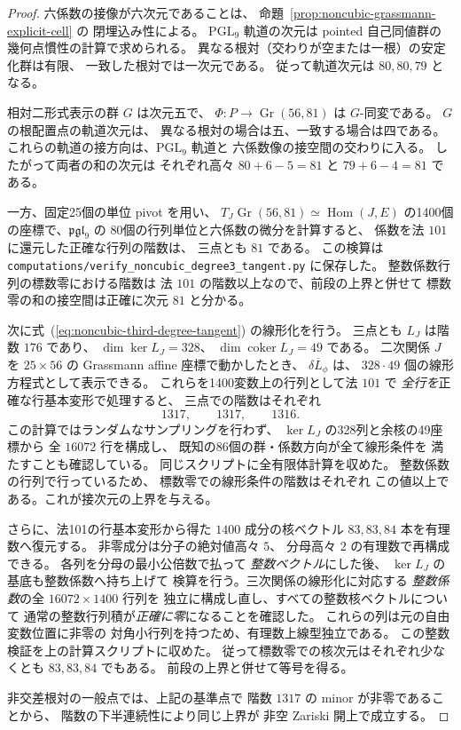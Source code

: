 \begin{proof}
六係数の接像が六次元であることは、
命題~\ref{prop:noncubic-grassmann-explicit-cell} の
閉埋込み性による。
$\mathrm{PGL}_9$ 軌道の次元は pointed 自己同値群の
幾何点慣性の計算で求められる。
異なる根対（交わりが空または一根）の安定化群は有限、
一致した根対では一次元である。
従って軌道次元は $80,80,79$ となる。

相対二形式表示の群 $G$ は次元五で、
$\Phi:P\to\operatorname{Gr}(56,81)$ は $G$-同変である。
$G$ の根配置点の軌道次元は、
異なる根対の場合は五、一致する場合は四である。
これらの軌道の接方向は、$\mathrm{PGL}_9$ 軌道と
六係数像の接空間の交わりに入る。
したがって両者の和の次元は
それぞれ高々 $80+6-5=81$ と
$79+6-4=81$ である。

一方、固定25個の単位 pivot を用い、
$T_J\operatorname{Gr}(56,81)\simeq\operatorname{Hom}(J,E)$
の1400個の座標で、$\mathfrak{pgl}_9$ の
80個の行列単位と六係数の微分を計算すると、
係数を法 $101$ に還元した正確な行列の階数は、
三点とも $81$ である。
この検算は
\texttt{computations/verify\_noncubic\_degree3\_tangent.py}
に保存した。
整数係数行列の標数零における階数は
法 $101$ の階数以上なので、前段の上界と併せて
標数零の和の接空間は正確に次元 $81$ と分かる。

次に式~(\ref{eq:noncubic-third-degree-tangent}) の線形化を行う。
三点とも $L_J$ は階数 $176$ であり、
$\dim\ker L_J=328$、
$\dim\operatorname{coker}L_J=49$ である。
二次関係 $J$ を $25\times56$ の Grassmann affine 座標で動かしたとき、
$\overline{\delta L_\phi}$ は、
$328\cdot49$ 個の線形方程式として表示できる。
これらを1400変数上の行列として法 $101$ で
\emph{全行を}正確な行基本変形で処理すると、
三点での階数はそれぞれ
\[
 1317,\qquad 1317,\qquad 1316 .
\]
この計算ではランダムなサンプリングを行わず、
$\ker L_J$ の328列と余核の49座標から
全 $16072$ 行を構成し、
既知の86個の群・係数方向が全て線形条件を
満たすことも確認している。
同じスクリプトに全有限体計算を収めた。
整数係数の行列で行っているため、
標数零での線形条件の階数はそれぞれ
この値以上である。これが接次元の上界を与える。

さらに、法101の行基本変形から得た
$1400$ 成分の核ベクトル
$83,83,84$ 本を有理数へ復元する。
非零成分は分子の絶対値高々 $5$、
分母高々 $2$ の有理数で再構成できる。
各列を分母の最小公倍数で払って
\emph{整数ベクトル}にした後、
$\ker L_J$ の基底も整数係数へ持ち上げて
検算を行う。三次関係の線形化に対応する
\emph{整数係数}の全 $16072\times1400$ 行列を
独立に構成し直し、すべての整数核ベクトルについて
通常の整数行列積が\emph{正確に零}になることを確認した。
これらの列は元の自由変数位置に非零の
対角小行列を持つため、有理数上線型独立である。
この整数検証を上の計算スクリプトに収めた。
従って標数零での核次元はそれぞれ少なくとも
$83,83,84$ でもある。
前段の上界と併せて等号を得る。

非交差根対の一般点では、上記の基準点で
階数 $1317$ の minor が非零であることから、
階数の下半連続性により同じ上界が
非空 Zariski 開上で成立する。
\end{proof}

